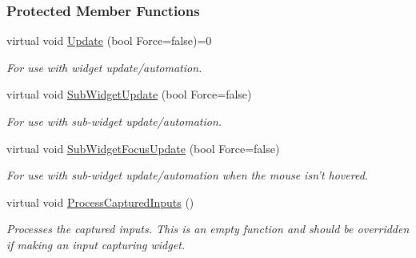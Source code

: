 \subsubsection*{Protected Member Functions}
\begin{DoxyCompactItemize}
\item 
\hypertarget{classphys_1_1UI_1_1Widget_a1806425fcd684c2f0d50cd0ef4a6b0da}{
virtual void \hyperlink{classphys_1_1UI_1_1Widget_a1806425fcd684c2f0d50cd0ef4a6b0da}{Update} (bool Force=false)=0}
\label{classphys_1_1UI_1_1Widget_a1806425fcd684c2f0d50cd0ef4a6b0da}

\begin{DoxyCompactList}\small\item\em For use with widget update/automation. \item\end{DoxyCompactList}\item 
\hypertarget{classphys_1_1UI_1_1Widget_a3472e5d0f8281e704d67d419980cd918}{
virtual void \hyperlink{classphys_1_1UI_1_1Widget_a3472e5d0f8281e704d67d419980cd918}{SubWidgetUpdate} (bool Force=false)}
\label{classphys_1_1UI_1_1Widget_a3472e5d0f8281e704d67d419980cd918}

\begin{DoxyCompactList}\small\item\em For use with sub-\/widget update/automation. \item\end{DoxyCompactList}\item 
\hypertarget{classphys_1_1UI_1_1Widget_a4a7e18c48a7cd230fd4a0aa274c6a654}{
virtual void \hyperlink{classphys_1_1UI_1_1Widget_a4a7e18c48a7cd230fd4a0aa274c6a654}{SubWidgetFocusUpdate} (bool Force=false)}
\label{classphys_1_1UI_1_1Widget_a4a7e18c48a7cd230fd4a0aa274c6a654}

\begin{DoxyCompactList}\small\item\em For use with sub-\/widget update/automation when the mouse isn't hovered. \item\end{DoxyCompactList}\item 
\hypertarget{classphys_1_1UI_1_1Widget_ac51b863fb1a9c5ebaef1386b77dbda99}{
virtual void \hyperlink{classphys_1_1UI_1_1Widget_ac51b863fb1a9c5ebaef1386b77dbda99}{ProcessCapturedInputs} ()}
\label{classphys_1_1UI_1_1Widget_ac51b863fb1a9c5ebaef1386b77dbda99}

\begin{DoxyCompactList}\small\item\em Processes the captured inputs. This is an empty function and should be overridden if making an input capturing widget. \item\end{DoxyCompactList}\end{DoxyCompactItemize}
